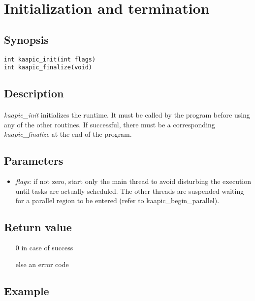 \documentclass[a4paper, 11pt]{article}
\begin{document}
\newpage
\section{Initialization and termination}

\subsection{Synopsis}
\begin{small}
\lstset{language=C}
\begin{lstlisting}[frame=tb]
int kaapic_init(int flags)
int kaapic_finalize(void)
\end{lstlisting}
\end{small}

\subsection{Description}
\paragraph{}
\textit{kaapic\_init} initializes the runtime. 
It must be called  by the program before using any of the other routines. 
If successful, there must be a
corresponding \textit{kaapic\_finalize} at the end of the program.

\subsection{Parameters}
\begin{itemize}
\item \textit{flags}: if not zero, start only the main thread to avoid disturbing
the execution until tasks are actually scheduled. The other threads are suspended
waiting for a parallel region to be entered (refer to kaapic\_begin\_parallel).
\end{itemize}

\subsection{Return value}
\begin{itemize}
\item [0] in case of success
\item [else] an error code
\end{itemize}

\subsection{Example}
\end{document}
